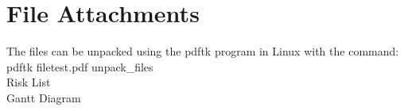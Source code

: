 \section{File Attachments}\label{attachments} 
The files can be unpacked using the pdftk program in Linux with the command: 
    pdftk filetest.pdf unpack\_files \\
     Risk List \\
     Gantt Diagram \\
    
